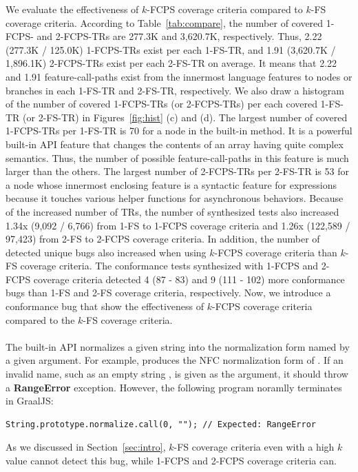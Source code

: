 We evaluate the effectiveness of $k$-FCPS coverage criteria compared to $k$-FS
coverage criteria.
%
According to Table~\ref{tab:compare}, the number of covered 1-FCPS- and
2-FCPS-TRs are 277.3K and 3,620.7K, respectively.
%
Thus, 2.22 (277.3K / 125.0K) 1-FCPS-TRs exist per each 1-FS-TR, and 1.91
(3,620.7K / 1,896.1K) 2-FCPS-TRs exist per each 2-FS-TR on average.
%
It means that 2.22 and 1.91 feature-call-paths exist from the innermost
language features to nodes or branches in each 1-FS-TR and 2-FS-TR,
respectively.
%
We also draw a histogram of the number of covered 1-FCPS-TRs (or 2-FCPS-TRs) per
each covered 1-FS-TR (or 2-FS-TR) in Figures~\ref{fig:hist} (c) and (d).
%
The largest number of covered 1-FCPS-TRs per 1-FS-TR is 70 for a node
in the  built-in method.
%
It is a powerful built-in API feature that changes the contents of an array
having quite complex semantics.
%
Thus, the number of possible feature-call-paths in this feature is much larger
than the others.
%
The largest number of 2-FCPS-TRs per 2-FS-TR is 53 for a node whose innermost
enclosing feature is a syntactic feature for  expressions because
it touches various helper functions for asynchronous behaviors.
%
Because of the increased number of TRs, the number of synthesized tests also
increased 1.34x (9,092 / 6,766) from 1-FS to 1-FCPS coverage criteria and 1.26x
(122,589 / 97,423) from 2-FS to 2-FCPS coverage criteria.
%
In addition, the number of detected unique bugs also increased when using
$k$-FCPS coverage criteria than $k$-FS coverage criteria.
%
The conformance tests synthesized with 1-FCPS and 2-FCPS coverage criteria
detected 4 (87 - 83) and 9 (111 - 102) more conformance bugs than
1-FS and 2-FS coverage criteria, respectively.
%
Now, we introduce a conformance bug that show the effectiveness of $k$-FCPS
coverage criteria compared to the $k$-FS coverage criteria.


\paragraph{\textbf{}}
%
The  built-in API normalizes a given string
into the normalization form named by a given argument.
%
For example,  produces the NFC normalization form
of .
%
If an invalid name, such as an empty string , is given as the
argument, it should throw a \textbf{RangeError} exception.
%
However, the following program noramlly terminates in GraalJS:
\begin{lstlisting}[style=JS, basicstyle=\footnotesize\ttfamily]
    String.prototype.normalize.call(0, ""); // Expected: RangeError
\end{lstlisting}
As we discussed in Section~\ref{sec:intro},
$k$-FS coverage criteria even with a high $k$ value cannot detect this bug,
while 1-FCPS and 2-FCPS coverage criteria can.


